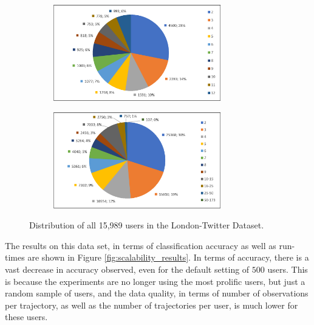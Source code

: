 \begin{figure}[p]
	\centering
  \begin{subfigure}[b]{\textwidth}
    \centering
    \includegraphics[width = 0.8\textwidth]{figures/15989_trajectories_per_user}
    \label{fig:15989_traj}
  \end{subfigure}

  \begin{subfigure}[b]{\textwidth}
    \centering
    \includegraphics[width = 0.8\textwidth]{figures/15989_observations_per_trajectory}
    \label{fig:15989_obs}
  \end{subfigure}
  \caption{Distribution of all 15,989 users in the London-Twitter Dataset.}
  \label{fig:15989_dist}
	\figSpace
\end{figure}

The results on this data set, in terms of classification accuracy as well as run-times are shown in Figure \ref{fig:scalability_results}. In terms of accuracy, there is a vast decrease in accuracy observed, even for the default setting of $500$ users. This is because the experiments are no longer using the most prolific users, but just a random sample of users, and the data quality, in terms of number of observations per trajectory, as well as the number of trajectories per user, is much lower for these users.

